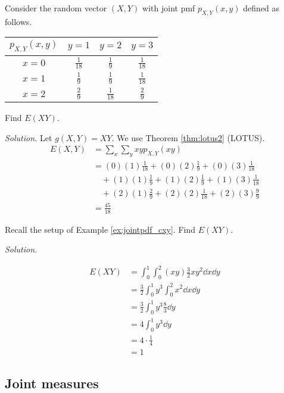\begin{example}[]
	Consider the random vector $(X,Y)$ with joint pmf $p_{X,Y}(x,y)$ defined as follows.

	\begin{center}
	\begin{tabular}{c | c c c}
		$p_{X,Y}(x,y)$ & $y=1$ & $y=2$ & $y=3$\\ \hline
		$x=0$ & $\frac{1}{18}$ & $\frac{1}{9}$ & $\frac{1}{18}$\\
		$x=1$ & $\frac{1}{9}$ & $\frac{1}{9}$ & $\frac{1}{18}$\\
		$x=2$ & $\frac{2}{9}$ & $\frac{1}{18}$ & $\frac{2}{9}$
	\end{tabular}
	\end{center}

	Find $E(XY)$.

	\textit{Solution.} Let $g(X,Y)=XY$. We use Theorem \ref{thm:lotus2} (LOTUS).
	\begin{align*}
		E(X,Y)&=\sum_{x}\sum_{y}xyp_{X,Y}(xy)\\
		&=(0)(1)\frac{1}{18}+(0)(2)\frac{1}{9}+(0)(3)\frac{1}{18}\\
		&\quad +(1)(1)\frac{1}{9}+(1)(2)\frac{1}{9}+(1)(3)\frac{1}{18}\\
		&\quad +(2)(1)\frac{2}{9}+(2)(2)\frac{1}{18}+(2)(3)\frac{9}{9}\\
		&=\frac{45}{18}
	\end{align*}
\end{example}

\begin{example}[]\label{ex:jointpdf_E(XY)}
	Recall the setup of Example \ref{ex:jointpdf_cxy}. Find $E(XY)$.

	\textit{Solution.}

	\begin{align*}
		E(XY)&=\int_0^1\int_0^2(xy)\frac 32xy^2\dd x\dd y\\
		&=\frac 32\int_0^1y^3\int_0^2x^2\dd x\dd y\\
		&=\frac 32\int_0^1y^3\frac 83\dd y\\
		&=4\int_0^1y^3\dd y\\
		&=4\cdot\frac 14\\
		&=1
	\end{align*}
\end{example}

\subsection{Joint measures}

